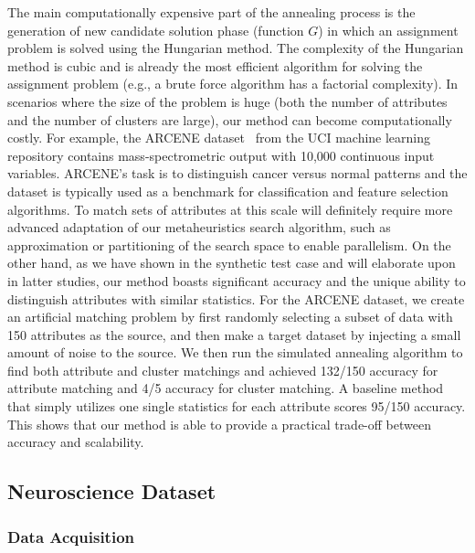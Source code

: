 The main computationally expensive part of the annealing process is the generation of new candidate solution phase (function $G$) in which an assignment problem is solved using the Hungarian method. The complexity of the Hungarian method is cubic and is already the most efficient algorithm for solving the assignment problem (e.g., a brute force algorithm has a factorial complexity). In scenarios where the size of the problem is huge (both the number of attributes and the number of clusters are large), our method can become computationally costly. For example, the ARCENE dataset~\cite{ARCENE} from the UCI machine learning repository contains mass-spectrometric output with 10,000 continuous input variables. ARCENE's task is to distinguish cancer versus normal patterns and the dataset is typically used as a benchmark for classification and feature selection algorithms. To match sets of attributes at this scale will definitely require more advanced adaptation of our metaheuristics search algorithm, such as approximation or partitioning of the search space to enable parallelism. On the other hand, as we have shown in the synthetic test case and will elaborate upon in latter studies, our method boasts significant accuracy and the unique ability to distinguish attributes with similar statistics.  For the ARCENE dataset, we create an artificial matching problem by first randomly selecting a subset of data with 150 attributes as the source, and then make a target dataset by injecting a small amount of noise to the source. We then run the simulated annealing algorithm to find both attribute and cluster matchings and achieved 132/150 accuracy for attribute matching and 4/5 accuracy for cluster matching. A baseline method that simply utilizes one single statistics for each attribute scores 95/150 accuracy. This shows that our method is able to provide a practical trade-off between accuracy and scalability.

\subsection{Neuroscience Dataset}
\subsubsection{Data Acquisition}

